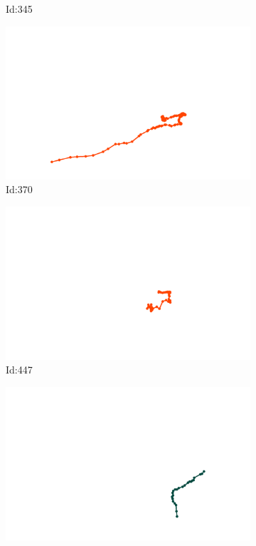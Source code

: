 \documentclass[12pt,twoside]{report}
\begin{document}
\begin{figure}
\begin{subfigure}[b]{0.20\textwidth}
\caption{Id:345}
\end{subfigure}
\begin{subfigure}[b]{0.20\textwidth}
\centering
\includegraphics[width=\textwidth]{../trajectories/370.png}
\caption{Id:370}
\end{subfigure}
\begin{subfigure}[b]{0.20\textwidth}
\centering
\includegraphics[width=\textwidth]{../trajectories/447.png}
\caption{Id:447}
\end{subfigure}
\begin{subfigure}[b]{0.20\textwidth}
\centering
\includegraphics[width=\textwidth]{../trajectories/458.png}

\end{subfigure}
\end{figure}
\end{document}
